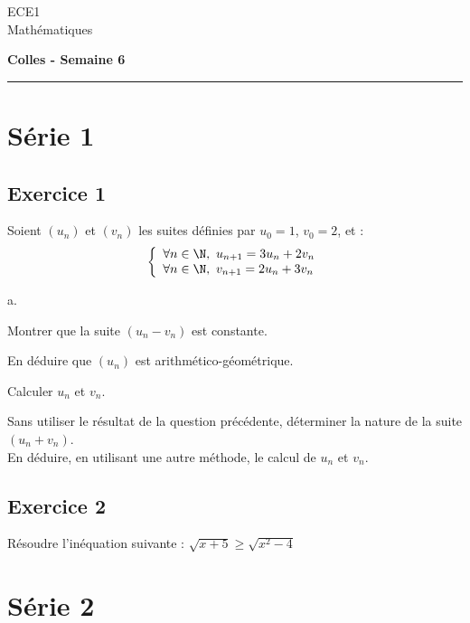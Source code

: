 \documentclass[11pt]{article}%
\begin{document}
\begin{flushleft}
ECE1 \\
Mathématiques
\end{flushleft}

\begin{center}
\textbf{\Large{Colles - Semaine 6}}
\end{center}

\hrule

\vspace*{0,2cm}

\section{Série 1}

\subsection*{Exercice 1}
\noindent
  Soient $(u_n)$ et $(v_n)$ les suites définies par $u_0 = 1$, $v_0 =
  2$, et :
  \[
  \left\{
  \begin{array}{l}
    \forall n \in \N, \ u_{n+1} = 3 u_n + 2 v_n \\
    \forall n \in \N, \ v_{n+1} = 2 u_n + 3 v_n 
  \end{array}
  \right.
  \]
  \begin{noliste}{a.}
  \item Montrer que la suite $(u_n-v_n)$ est constante.
  \item En déduire que $(u_n)$ est arithmético-géométrique.
  \item Calculer $u_n$ et $v_n$.
  \item Sans utiliser le résultat de la question précédente,
    déterminer la nature de la suite $(u_n + v_n)$.\\
    En déduire, en utilisant une autre méthode, le calcul de $u_n$ et
    $v_n$.
  \end{noliste}

  
\subsection*{Exercice 2}
\noindent
Résoudre l'inéquation suivante : $\sqrt{x+5} \geq \sqrt{x^{2}-4}$



\section{Série 2}
\end{document}

